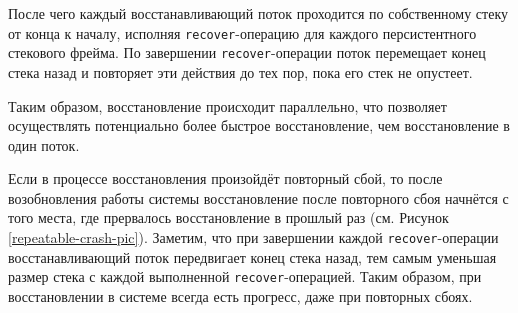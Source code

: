 \documentclass[times,specification,annotation]{itmo-student-thesis}
\begin{document}
После чего каждый восстанавливающий поток проходится по собственному стеку от конца к началу, исполняя \texttt{recover}-операцию для каждого персистентного стекового фрейма. По завершении \texttt{recover}-операции поток перемещает конец стека назад и повторяет эти действия до тех пор, пока его стек не опустеет.

Таким образом, восстановление происходит параллельно, что позволяет осуществлять потенциально более быстрое восстановление, чем восстановление в один поток.

Если в процессе восстановления произойдёт повторный сбой, то после возобновления работы системы восстановление после повторного сбоя начнётся с того места, где прервалось восстановление в прошлый раз (см. Рисунок \ref{repeatable-crash-pic}). Заметим, что при завершении каждой \texttt{recover}-операции восстанавливающий поток передвигает конец стека назад, тем самым уменьшая размер стека с каждой выполненной \texttt{recover}-операцией. Таким образом, при восстановлении в системе всегда есть прогресс, даже при повторных сбоях.
\end{document}
